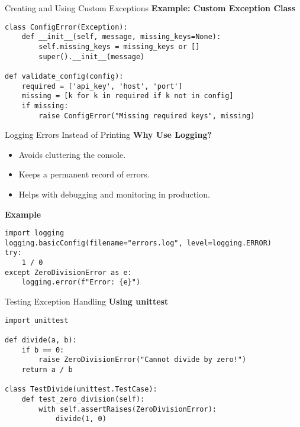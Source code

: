 \documentclass[aspectratio=169]{beamer}
\begin{document}
\begin{frame}[fragile]{Creating and Using Custom Exceptions}
    \textbf{Example: Custom Exception Class}
    \pause
    \begin{lstlisting}
class ConfigError(Exception):
    def __init__(self, message, missing_keys=None):
        self.missing_keys = missing_keys or []
        super().__init__(message)

def validate_config(config):
    required = ['api_key', 'host', 'port']
    missing = [k for k in required if k not in config]
    if missing:
        raise ConfigError("Missing required keys", missing)
    \end{lstlisting}
\end{frame}


\begin{frame}[fragile]{Logging Errors Instead of Printing}
    \textbf{Why Use Logging?}
    \begin{itemize}[<+->]
        \item Avoids cluttering the console.
        \item Keeps a permanent record of errors.
        \item Helps with debugging and monitoring in production.
    \end{itemize}

    \pause
    \textbf{Example}
    \pause
    \begin{lstlisting}
import logging
logging.basicConfig(filename="errors.log", level=logging.ERROR)
try:
    1 / 0
except ZeroDivisionError as e:
    logging.error(f"Error: {e}")
    \end{lstlisting}
\end{frame}

\begin{frame}[fragile]{Testing Exception Handling}
    \textbf{Using unittest}
    \pause
    \begin{lstlisting}
import unittest

def divide(a, b):
    if b == 0:
        raise ZeroDivisionError("Cannot divide by zero!")
    return a / b

class TestDivide(unittest.TestCase):
    def test_zero_division(self):
        with self.assertRaises(ZeroDivisionError):
            divide(1, 0)
    \end{lstlisting}
\end{frame}
\end{document}
